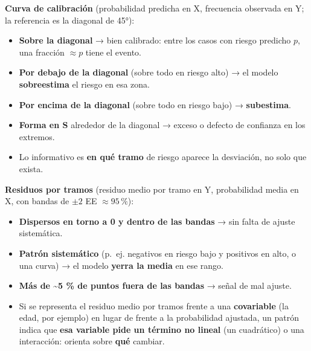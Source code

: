 \documentclass[
  letterpaper,
  DIV=11,
  numbers=noendperiod]{scrartcl}
\providecommand{\tightlist}{%
  \setlength{\itemsep}{0pt}\setlength{\parskip}{0pt}}\usepackage{longtable,booktabs,array}
\begin{document}
\begin{tcolorbox}[enhanced jigsaw, coltitle=black, rightrule=.15mm, arc=.35mm, leftrule=.75mm, colback=white, colbacktitle=quarto-callout-tip-color!10!white, left=2mm, breakable, toptitle=1mm, toprule=.15mm, bottomtitle=1mm, titlerule=0mm, title=\textcolor{quarto-callout-tip-color}{\faLightbulb}\hspace{0.5em}{Cómo leer los dos gráficos}, bottomrule=.15mm, opacityback=0, opacitybacktitle=0.6, colframe=quarto-callout-tip-color-frame]

\textbf{Curva de calibración} (probabilidad predicha en X, frecuencia
observada en Y; la referencia es la diagonal de 45°):

\begin{itemize}
\tightlist
\item
  \textbf{Sobre la diagonal} → bien calibrado: entre los casos con
  riesgo predicho \(p\), una fracción \(\approx p\) tiene el evento.
\item
  \textbf{Por debajo de la diagonal} (sobre todo en riesgo alto) → el
  modelo \textbf{sobreestima} el riesgo en esa zona.
\item
  \textbf{Por encima de la diagonal} (sobre todo en riesgo bajo) →
  \textbf{subestima}.
\item
  \textbf{Forma en S} alrededor de la diagonal → exceso o defecto de
  confianza en los extremos.
\item
  Lo informativo es \textbf{en qué tramo} de riesgo aparece la
  desviación, no solo que exista.
\end{itemize}

\textbf{Residuos por tramos} (residuo medio por tramo en Y, probabilidad
media en X, con bandas de \(\pm 2\) EE \(\approx 95\,\%\)):

\begin{itemize}
\tightlist
\item
  \textbf{Dispersos en torno a 0 y dentro de las bandas} → sin falta de
  ajuste sistemática.
\item
  \textbf{Patrón sistemático} (p.~ej. negativos en riesgo bajo y
  positivos en alto, o una curva) → el modelo \textbf{yerra la media} en
  ese rango.
\item
  \textbf{Más de \textasciitilde5 \% de puntos fuera de las bandas} →
  señal de mal ajuste.
\item
  Si se representa el residuo medio por tramos frente a una
  \textbf{covariable} (la edad, por ejemplo) en lugar de frente a la
  probabilidad ajustada, un patrón indica que \textbf{esa variable pide
  un término no lineal} (un cuadrático) o una interacción: orienta sobre
  \textbf{qué} cambiar.
\end{itemize}

\end{tcolorbox}
\end{document}
